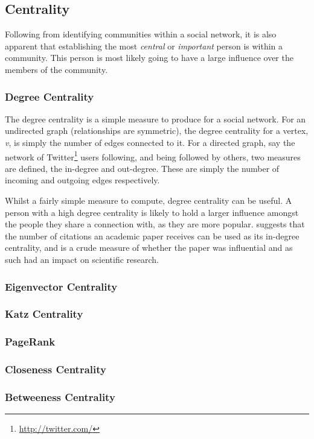\subsection{Centrality}
Following from identifying communities within a social network, it is also apparent that establishing the most \emph{central} or \emph{important} person is within a community. This person is most likely going to have a large influence over the members of the community.

\subsubsection{Degree Centrality}
The degree centrality is a simple measure to produce for a social network. For an undirected graph (relationships are symmetric), the degree centrality for a vertex, \emph{v}, is simply the number of edges connected to it. For a directed graph, say the network of Twitter\footnote{\url{http://twitter.com/}} users following, and being followed by others, two measures are defined, the in-degree and out-degree. These are simply the number of incoming and outgoing edges respectively.

Whilst a fairly simple measure to compute, degree centrality can be useful. A person with a high degree centrality is likely to hold a larger influence amongst the people they share a connection with, as they are more popular. \cite[p.~169]{newman10} suggests that the number of citations an academic paper receives can be used as its in-degree centrality, and is a crude measure of whether the paper was influential and as such had an impact on scientific research.

\subsubsection{Eigenvector Centrality}

\subsubsection{Katz Centrality}

\subsubsection{PageRank}

\subsubsection{Closeness Centrality}

\subsubsection{Betweeness Centrality}

